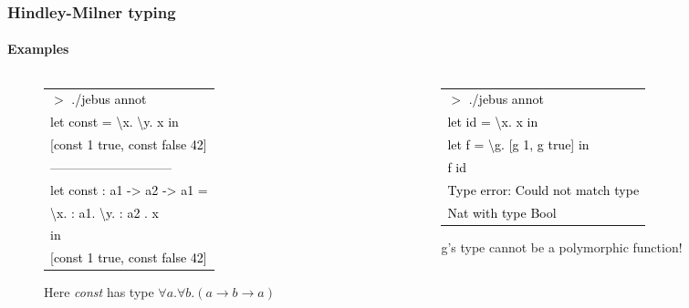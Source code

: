 \documentclass[xcolor=table]{beamer}
\newcommand{\tab}{\hspace*{1.2em}}
\begin{document}
\begin{frame}
\frametitle{Hindley-Milner typing}
\framesubtitle{Examples}
\begin{block}
{ 
     \begin{columns}[t] %
     \begin{column}[T]{5cm} %
          \begin{figure}[h!]
				 \begin{small}
				 \begin{tabular}{l}
				 \textcolor{black}{
			      $>$ ./jebus annot} \\
			      \textcolor{black}{let const = \textbackslash x. \textbackslash y. x in} \\ \relax
			      \textcolor{black}{[const 1 true, const false 42]} \\
			      \textcolor{black}{-----------------------------} \\
			      \textcolor{black}{let const : a1 -> a2 -> a1 =} \\
			      \textcolor{black}{\tab \textbackslash x. : a1. \textbackslash y. : a2 . x}  \\
			      \textcolor{black}{in} \\ \relax
			      \textcolor{black}{\tab [const 1 true, const false 42]}
			      \end{tabular}	
				 \end{small}
			  \caption{Here \textit{const} has type $\forall a. \forall b. (a \rightarrow b \rightarrow a)$}
		 \end{figure}
     \end{column}
     \begin{column}[T]{5cm} %
		 \begin{figure}[h!]
				\begin{small}
				\rowcolors{1}{gray}{gray}
			  	\begin{tabular}{l}
			      \textcolor{black}{$>$ ./jebus annot} \\
			      \textcolor{black}{let id = \textbackslash x.  x in}\\ \relax
			      \textcolor{black}{let f = \textbackslash g. [g 1, g true] in}\\
			      \textcolor{black}{\tab f id} \\
			      \textcolor{black}{Type error: Could not match type } \\
			      \textcolor{black}{Nat with type Bool}
				\end{tabular}	
			  \end{small}			  
			  \caption{g's type cannot be a polymorphic function!}
		 \end{figure}	          
     \end{column}
     \end{columns}
}

\end{block}
\end{frame}
\end{document}

